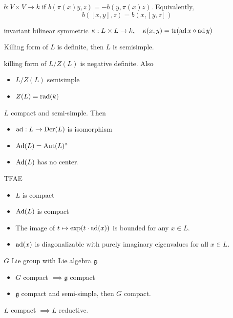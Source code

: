 \begin{definition} $b: V \times V \to k$ if $b(\pi(x)y, z) = -b(y, \pi(x)z)$. Equivalently,
\[
b ([x,y], z) = b(x, [y,z])
\]
\end{definition}

\begin{definition} invariant bilinear symmetric $\kappa : L \times L \to k, \quad \kappa(x,y) = \operatorname{tr} (\operatorname{ad} x \circ \operatorname{ad} y)$
\end{definition}

\begin{proposition} Killing form of $L$ is definite, then $L$ is semisimple.
\end{proposition}

\begin{definition} killing form of $L / Z(L)$ is negative definite. Also
\begin{itemize}[topsep=-6pt, itemsep=0pt]
    \item $L / Z(L)$ semisimple
    \item $Z(L) = \operatorname{rad} (k)$
\end{itemize}
\end{definition}

\begin{proposition} $L$ compact and semi-simple. Then
\begin{itemize}[topsep=-6pt, itemsep=0pt]
    \item $\operatorname{ad} : L \to \operatorname{Der}(L)$ is isomorphism 
    \item $\operatorname{Ad} (L) = \operatorname{Aut}(L)^{\circ}$ 
    \item $\operatorname{Ad} (L)$ has no center.
\end{itemize}
\end{proposition}

\begin{proposition} TFAE
\begin{itemize}[topsep=-6pt, itemsep=0pt]
    \item $L$ is compact
    \item $\operatorname{Ad}(L)$ is compact
    \item The image of $t \mapsto \exp (t \cdot \operatorname{ad} (x))$ is bounded for any $x \in L$. 
    \item $\operatorname{ad}(x)$ is diagonalizable with purely imaginary eigenvalues for all $x \in L$. 
\end{itemize}
\end{proposition}

\begin{proposition} $G$ Lie group with Lie algebra $\mathfrak{g}$. 
\begin{itemize}[topsep=-6pt, itemsep=0pt]
    \item $G$ compact $\implies \mathfrak{g}$ compact
    \item $\mathfrak{g}$ compact and semi-simple, then $G$ compact.
\end{itemize}
\end{proposition}

\begin{proposition} $L$ compact $\implies L$ reductive.
\end{proposition}
